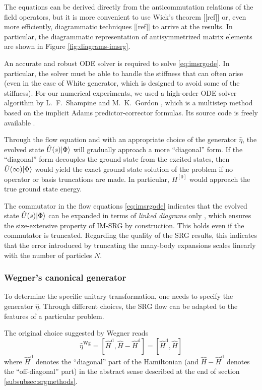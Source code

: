 The equations can be derived directly from the anticommutation relations of the field operators, but it is more convenient to use Wick's theorem [[ref]] or, even more efficiently, diagrammatic techniques [[ref]] to arrive at the results.  In particular, the diagrammatic representation of antisymmetrized matrix elements are shown in Figure \ref{fig:diagrams-imsrg}.

An accurate and robust ODE solver is required to solve \eqref{eq:imsrgode}.  In particular, the solver must be able to handle the stiffness that can often arise (even in the case of White generator, which is designed to avoid some of the stiffness).  For our numerical experiments, we used a high-order ODE solver algorithm by L.\ F.\ Shampine and M.\ K.\ Gordon \cite{shampine1975computer}, which is a multistep method based on the implicit Adams predictor-corrector formulas.  Its source code is freely available \cite{odesolver}.

Through the flow equation and with an appropriate choice of the generator $\hat{\eta}$, the evolved state $\hat U(s) | \Phi \rangle$ will gradually approach a more ``diagonal'' form.  If the ``diagonal'' form decouples the ground state from the excited states, then $\hat U(\infty) | \Phi \rangle$ would yield the exact ground state solution of the problem if no operator or basis truncations are made.  In particular, $H^{[0]}$ would approach the true ground state energy.

The commutator in the flow equations \eqref{eq:imsrgode} indicates that the evolved state $\hat U(s) | \Phi \rangle$ can be expanded in terms of \emph{linked diagrams} only \cite{shavitt2009many,ISI:A1981MN73700014}, which ensures the size-extensive property of IM-SRG by construction.  This holds even if the commutator is truncated.  Regarding the quality of the SRG results, this indicates that the error introduced by truncating the many-body expansions scales linearly with the number of particles $N$.

\subsubsection{Wegner's canonical generator}
\label{subsec:Wegner}

To determine the specific unitary transformation, one needs to specify the generator $\hat{\eta}$.  Through different choices, the SRG flow can be adapted to the features of a particular problem.

The original choice suggested by Wegner \cite{Wegner200177} reads
\begin{equation}
  \hat{\eta}^{\text{Wg}}
  = [\hat{H}^{\text{d}}, \hat{H} - \hat{H}^{\text{d}}]
  = [\hat{H}^{\text{d}}, \hat{H}]
  \label{eq:etaWegner}
\end{equation}
where $\hat{H}^{\text{d}}$ denotes the ``diagonal'' part of the Hamiltonian (and $\hat{H} - \hat{H}^{\text{d}}$ denotes the ``off-diagonal'' part) in the abstract sense described at the end of section \ref{subsubsec:srgmethods}.

